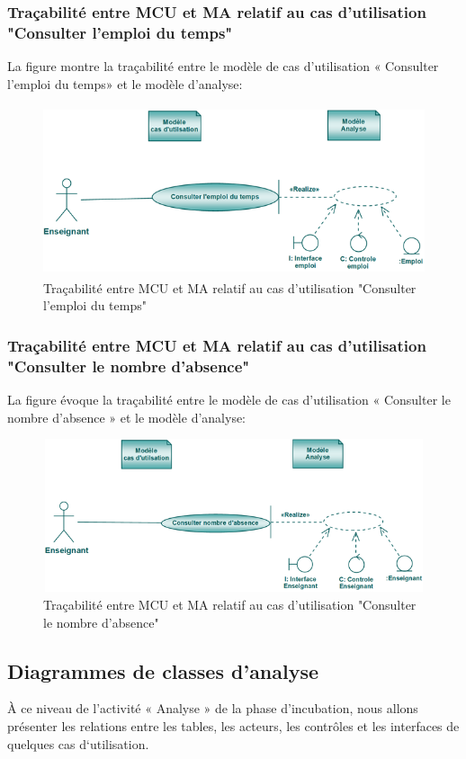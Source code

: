 \documentclass[12 pt ]{report}
\begin{document}
\subsubsection{Traçabilité entre MCU et MA relatif au cas d’utilisation "Consulter l'emploi du temps" }
La figure  montre la traçabilité entre le modèle de cas d’utilisation « Consulter l'emploi du temps» et le modèle d’analyse:

\begin{figure}[h]
\begin{center}
\includegraphics[width= 14cm , height =5cm]{cee.png}
\caption{Traçabilité entre MCU et MA relatif au cas d’utilisation "Consulter l'emploi du temps"}
\end{center}
\end{figure}
\subsubsection{Traçabilité entre MCU et MA relatif au cas d’utilisation "Consulter le nombre d'absence" }
La figure  évoque la traçabilité entre le modèle de cas d’utilisation « Consulter le nombre d'absence » et le modèle d’analyse:

\begin{figure}[h]
\begin{center}
\includegraphics[width= 14cm , height =4.5cm]{tcna.PNG}
\caption{Traçabilité entre MCU et MA relatif au cas d’utilisation "Consulter le nombre d'absence"}
\end{center}
\end{figure}
\subsection{Diagrammes de classes d'analyse}
 À ce niveau de l’activité « Analyse » de la phase d’incubation, nous allons présenter les relations entre les tables, les acteurs, les contrôles et les interfaces de quelques cas d‘utilisation.
\end{document}
